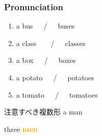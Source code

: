 \documentclass[aspectratio=169,xcolor={dvipsnames,table}]{beamer}
\newcommand{\myaudio}[1]{\href{#1}{\faVolumeUp}}
\begin{document}
\begin{frame}[plain]\frametitle{Pronunciation}

\begin{enumerate}
 \item a bus~~~\pause{}/~~~buses\pause%
\hfill{}\hspace{180pt}\mbox{} \item a class~~~~\pause{}/~~~classes\pause%
\hfill{}\hspace{180pt}\mbox{}
 \item a box~~~\pause{}/~~~boxes\pause%
\hfill{}\hspace{180pt}\mbox{}
 \item a potato~~~\pause{}/~~~potatoes\pause%
\hfill{}\hspace{180pt}\mbox{} \item a tomato~~~\pause{}/~~~tomatoes%
\hfill{}\hspace{180pt}\mbox{}

 \end{enumerate}


\bigskip

\bigskip

\mbox{}\hfill\myaudio{./audio/005_singular_plural_07.mp3}
\end{frame}
\begin{frame}[plain]{注意すべき複数形}
\scalebox{5}{\ManFace}\hspace{15pt}
\pause
{\LARGE a man}\pause{}
\pause

\bigskip

\bigskip

\scalebox{5}{\ManFace\hspace{5pt}\ManFace\hspace{5pt}\ManFace}\hspace{15pt}
\pause
{\LARGE three  \textcolor{orange}{\bfseries men}}\pause{}

\bigskip

\bigskip

\mbox{}\hfill\myaudio{./audio/005_singular_plural_08.mp3}
\end{frame}
\end{document}
